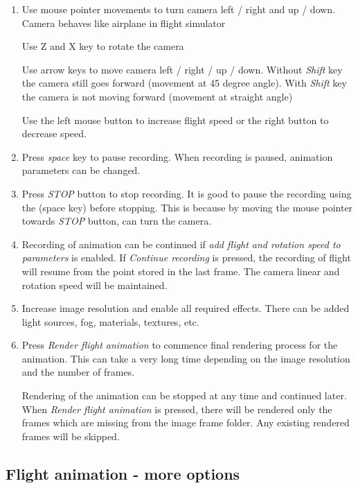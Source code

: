 \begin{enumerate}
	\item Use mouse pointer movements to turn camera left / right and up / down. Camera behaves like airplane in flight simulator
	
	Use Z and X key to rotate the camera
	
	Use arrow keys to move camera left / right / up / down. Without \emph{Shift} key the camera still goes forward (movement at 45 degree angle). With \emph{Shift} key the camera is not moving forward (movement at straight angle)
	
	Use the left mouse button to increase flight speed or the right button to decrease speed.
	
	\item Press \emph{space} key to pause recording. When recording is paused, animation parameters can be changed. 
	
	\item Press \emph{STOP} button to stop recording. It is good to pause the recording using the (space key) before stopping. This is  because by moving the mouse pointer towards \emph{STOP} button, can turn the camera.
	
	\item Recording of animation can be continued if \emph{add flight and rotation speed to parameters} is enabled. If \emph{Continue recording} is pressed, the recording of flight will resume from the point stored in the last frame. The camera linear and rotation speed will be maintained.
	
	\item Increase image resolution and enable all required effects. There can be added light sources, fog, materials, textures, etc.
	
	\item Press \emph{Render flight animation} to commence final rendering  process for the animation. This can take a very long time depending on the image resolution and the number of frames.
	
	Rendering of the animation can be stopped at any time and continued later. When \emph{Render flight animation} is pressed, there will be rendered only the frames which are missing from the image frame folder. Any existing rendered frames will be skipped.
	
\end{enumerate}
	
	\subsection{Flight animation - more options}
	
